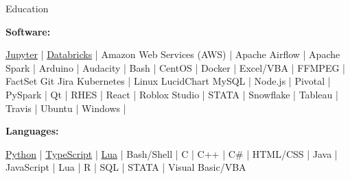 \documentclass{resume/resume}
\begin{document}
\begin{rSection}{Education}
\begin{adjustwidth}{6em}{0pt}
\end{adjustwidth}



\vspace{-3pt}
{\bf Software:}
\vspace{-1.83em}
\begin{adjustwidth}{6em}{0pt}
    \href{https://github.com/search?q=user\%3ASpelkington+user\%3AUtahTriangle+extension\%3Aipynb&type=Code}{Jupyter} | 
    \href{https://github.com/search?q=user\%3ASpelkington+databricks&type=Code}{Databricks} | 
    Amazon Web Services (AWS) | 
    Apache Airflow | 
    Apache Spark | 
    Arduino | 
    Audacity | 
    Bash | 
    CentOS | 
    Docker | 
    Excel/VBA | 
    FFMPEG | 
    FactSet
    Git
    Jira
    Kubernetes | 
    Linux
    LucidChart
    MySQL | 
    Node.js | 
    Pivotal | 
    PySpark | 
    Qt | 
    RHES | 
    React | 
    Roblox Studio | 
    STATA | 
    Snowflake | 
    Tableau | 
    Travis | 
    Ubuntu | 
    Windows | 

\end{adjustwidth}

\end{rSection}



\vspace{-0.4em}
{\bf Languages:}
\vspace{-1.83em}
\begin{adjustwidth}{6em}{0pt}
    \href{https://github.com/search?q=user\%3ASpelkington+user\%3AUtahTriangle+extension\%3Apy+extension\%3Aipynb&type=Code&ref=advsearch&l=&l=}{Python} | 
    \href{https://github.com/search?p=1&q=user\%3ASpelkington+extension\%3Ats+extension\%3Atsx&type=Code}{TypeScript} | 
    \href{https://github.com/search?q=user\%3ASpelkington+extension\%3Alua&type=Code}{Lua} | 
    Bash/Shell | 
    C | 
    C++ |
    C\# |
    HTML/CSS |
    Java | 
    JavaScript | 
    Lua | 
    R |
    SQL | 
    STATA |
    Visual Basic/VBA
\end{adjustwidth}

\end{document}
